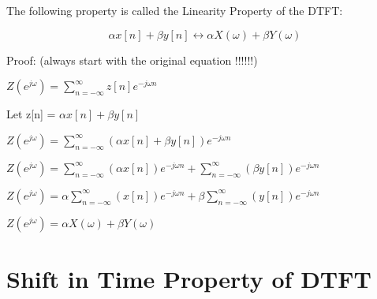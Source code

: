\documentclass[11pt]{article}
\begin{document}
The following property is called the Linearity Property of the DTFT:

\begin{center}

$$
\alpha x[n] + \beta y[n] \longleftrightarrow  \alpha X(\omega) + \beta Y(\omega)
$$
\end{center}

\vspace{4mm}

Proof: (always start with the original equation !!!!!!)\newline

\begin{center}

$ 
Z(e^{j \omega}) = \sum_{n = -\infty}^{\infty} z[n]  e^{-j \omega n}
$
\end{center}

\vspace{3mm}

Let z[n] = $\alpha x[n] + \beta y[n]$ \newline

\begin{center}

$ 
Z(e^{j \omega}) = \sum_{n = -\infty}^{\infty} ( \alpha x[n] + \beta y[n])  e^{-j \omega n}
$
\end{center}

\newpage

\begin{center}

$ 
Z(e^{j \omega}) = \sum_{n = -\infty}^{\infty} ( \alpha x[n] )  e^{-j \omega n} + \sum_{n = -\infty}^{\infty} (  \beta y[n])  e^{-j \omega n}
$
\end{center}

\vspace{3mm}

\begin{center}

$ 
Z(e^{j \omega}) = \alpha \sum_{n = -\infty}^{\infty} (  x[n] )  e^{-j \omega n} + \beta \sum_{n = -\infty}^{\infty} (  y[n])  e^{-j \omega n}
$
\end{center}

\vspace{3mm}

\begin{center}

$ 
Z(e^{j \omega}) = \alpha X(\omega) + \beta Y(\omega)
$
\end{center}


\section{Shift in Time Property of DTFT}
\end{document}
